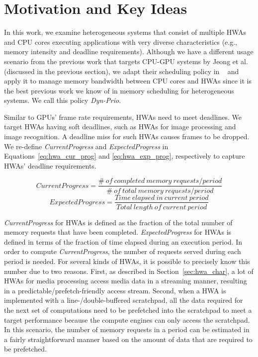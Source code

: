 \documentclass[10pt,letterpaper]{article}
\newcommand{\MODIFIED}[1]{#1}
\begin{document}
 \section{Motivation and Key Ideas}
\label{sec:motivation}

In this work, we examine heterogeneous systems that consist of multiple
HWAs and CPU cores executing applications with very diverse characteristics
(e.g., memory intensity and deadline requirements).
\MODIFIED{Although we have a different usage scenario from the previous work
that targets CPU-GPU systems by Jeong et al.~\cite{schedulingCPUGPU} (discussed
in the previous section), we adapt their scheduling policy in ~\cite{schedulingCPUGPU} and
apply it to manage memory bandwidth between CPU cores and HWAs since it
is the best previous work we know of in memory scheduling for heterogeneous systems.
We call this policy \emph{Dyn-Prio}.}



Similar to GPUs' frame rate requirements, HWAs need to meet
deadlines. We target HWAs having soft deadlines, such as HWAs for
image processing and image recognition. A deadline miss for such
HWAs causes frames to be dropped. We re-define
\emph{CurrentProgress} and \emph{ExpectedProgress} in
Equations~\ref{eq:hwa_cur_prog} and \ref{eq:hwa_exp_prog},
respectively to capture HWAs' deadline requirements.



\begin{small}
  \begin{equation}
    CurrentProgress =\frac{\#\ of\ completed\ memory\ requests / period}{\#\ of\ total\ memory\ requests / period}
    \label{eq:hwa_cur_prog}
  \end{equation}
  \begin{equation}
    ExpectedProgress = \frac{Time\ elapsed\ in\ current\ period}{Total\ length\ of\ current\ period}
    \label{eq:hwa_exp_prog}
  \end{equation}
\end{small}

{\it CurrentProgress} for HWAs is defined as the fraction of the total
number of memory requests that have been completed. {\it ExpectedProgress} for
HWAs is defined in terms of the fraction of time elapsed during an
execution period.  \MODIFIED{In order to compute {\it CurrentProgress}, the
number of requests served during each period is needed. For several kinds of
HWAs, it is possible to precisely know this number due to two reasons. First,
as described in Section~\ref{sec:hwa_char}, a lot of HWAs for media processing
access media data in a streaming manner, resulting in a
predictable/prefetch-friendly access stream. Second, when a HWA is implemented
with a line-/double-buffered scratchpad, all the data required for the next
set of computations need to be prefetched into the scratchpad to meet a target
performance because the compute engines can only access the scratchpad. In
this scenario, the number of memory requests in a period can be
estimated in a fairly straightforward manner based on the amount of data that
are required to be prefetched.}
\end{document}
